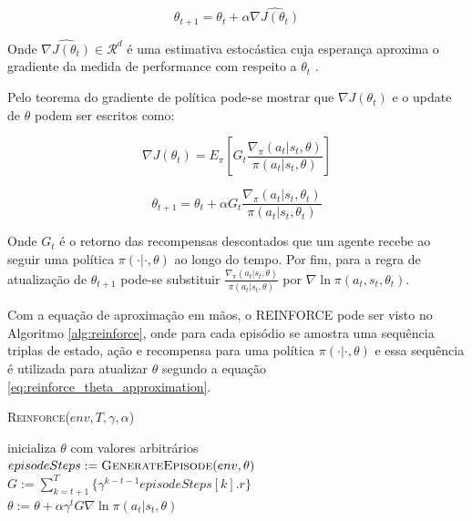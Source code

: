 \documentclass[letterpaper]{article}
\begin{document}
\begin{equation}
  \theta_{t+1} = \theta_t + \alpha \widehat{\nabla J(\theta_t)}
\end{equation}

Onde $\widehat{\nabla J(\theta_t)} \in \mathcal{R}^d$ é uma estimativa estocástica cuja esperança aproxima o gradiente da medida de performance com respeito a $\theta_t$ \cite{SuttonBarto-2018}.

Pelo teorema do gradiente de política pode-se mostrar que $\nabla J(\theta_t)$ e o update de $\theta$ podem ser escritos como:

\begin{equation}
  \label{eq:reinforce_theta_j_gradient}
  \nabla J(\theta_t) = E_{\pi} \left[ G_t \frac{\nabla_{\pi}(a_t|s_t, \theta)}{\pi(a_t|s_t, \theta)} \right]
\end{equation}

\begin{equation}
  \label{eq:reinforce_theta_approximation}
  \theta_{t+1} = \theta_t + \alpha G_t \frac{\nabla_{\pi}(a_t|s_t, \theta_t)}{\pi(a_t|s_t, \theta_t)} 
\end{equation}

Onde $G_t$ é o retorno das recompensas descontados que um agente recebe ao seguir uma política $\pi(\cdot | \cdot, \theta)$ ao longo do tempo. Por fim, para a regra de atualização de $\theta_{t+1}$ pode-se substituir $\frac{\nabla_{\pi}(a_t|s_t, \theta)}{\pi(a_t|s_t, \theta)}$ por $ \nabla \ln \pi(a_t, s_t, \theta_t) $.

Com a equação de aproximação em mãos, o \textsc{REINFORCE} pode ser visto no Algoritmo \ref{alg:reinforce}, onde para cada episódio se amostra uma sequência triplas de estado, ação e recompensa para uma política $\pi(\cdot | \cdot, \theta)$ e essa sequência é utilizada para atualizar $\theta$ segundo a equação \ref{eq:reinforce_theta_approximation}.

\linesnumbered
\dontprintsemicolon
\begin{algorithm}[t!]
{
	\caption{\textsc{Reinforce}($ env, T, \gamma, \alpha $)}
	\label{alg:reinforce}
    inicializa $ \theta $ com valores arbitrários \\

    {
      $episodeSteps := \textsc{GenerateEpisode}(env, \theta)$\\

      {
        $G := \sum_{k = t+1}^T \{ \gamma^{k-t-1} episodeSteps[k].r \}$\\
        $ \theta := \theta + \alpha \gamma^t G \nabla \ln \pi(a_t|s_t, \theta) $
      }
    }
}
\end{algorithm}
\end{document}
